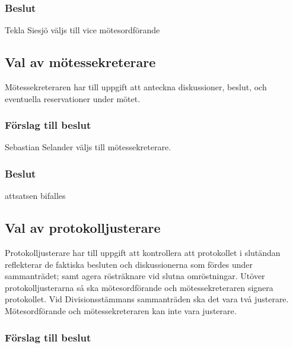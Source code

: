 \documentclass[protokoll]{dvd}
\begin{document}
\subsubsection*{Beslut}

\begin{attsatser}
    \item Tekla Siesjö väljs till vice mötesordförande
\end{attsatser}

\subsection{Val av mötessekreterare}

Mötessekreteraren har till uppgift att anteckna diskussioner, beslut, och eventuella reservationer under mötet.

\subsubsection*{Förslag till beslut}

\begin{attsatser}
	\item Sebastian Selander väljs till mötessekreterare.
\end{attsatser}

\subsubsection*{Beslut}

\begin{attsatser}
    \item attsatsen bifalles
\end{attsatser}


\subsection{Val av protokolljusterare}

Protokolljusterare har till uppgift att kontrollera att protokollet i slutändan reflekterar de faktiska besluten och diskussionerna som fördes under sammanträdet; samt agera rösträknare vid slutna omröstningar.
Utöver protokolljusterarna så ska mötesordförande och mötessekreteraren signera protokollet.
Vid Divisionsstämmans sammanträden ska det vara två justerare.
Mötesordförande och mötessekreteraren kan inte vara justerare.

\subsubsection*{Förslag till beslut}
\end{document}
